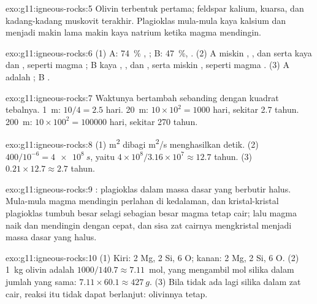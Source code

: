 \begin{solution}{exo:g11:igneous-rocks:5}
Olivin terbentuk pertama; feldspar kalium, kuarsa, dan kadang-kadang muskovit
terakhir. Plagioklas mula-mula kaya kalsium dan menjadi makin lama makin kaya
natrium ketika magma mendingin.
\end{solution}

\begin{solution}{exo:g11:igneous-rocks:6}
(1) A: \qty{74}{\percent} , ; B: \qty{47}{\percent}, .
(2) A miskin , , dan  serta kaya  dan
, seperti magma ; B kaya , , dan , serta
miskin , seperti magma . (3) A adalah ; B .
\end{solution}

\begin{solution}{exo:g11:igneous-rocks:7}
Waktunya bertambah sebanding dengan kuadrat tebalnya. \qty{1}{m}: $10/4 = 2.5$
hari. \qty{20}{m}: $10 \times 10^2 = 1000$ hari, sekitar 2.7 tahun.
\qty{200}{m}: $10 \times 100^2 = \num{100000}$ hari, sekitar 270 tahun.
\end{solution}

\begin{solution}{exo:g11:igneous-rocks:8}
(1) \unit{m^2} dibagi \unit{m^2/s} menghasilkan detik. (2) $400/10^{-6} =
\qty{4e8}{s}$, yaitu $4 \times 10^8 / 3.16 \times 10^7 \approx 12.7$
tahun. (3) $0.21 \times 12.7 \approx 2.7$ tahun.
\end{solution}

\begin{solution}{exo:g11:igneous-rocks:9}
 :  plagioklas dalam massa dasar yang berbutir
halus. Mula-mula magma mendingin perlahan di kedalaman, dan kristal-kristal
plagioklas tumbuh besar selagi sebagian besar magma tetap cair; lalu magma
naik dan mendingin dengan cepat, dan sisa zat cairnya mengkristal menjadi
massa dasar yang halus.
\end{solution}

\begin{solution}{exo:g11:igneous-rocks:10}
(1) Kiri: 2 Mg, 2 Si, 6 O; kanan: 2 Mg, 2 Si, 6 O. (2) \qty{1}{kg}
olivin adalah $1000/140.7 \approx 7.11$~mol, yang mengambil mol silika dalam
jumlah yang sama: $7.11 \times 60.1 \approx \qty{427}{g}$. (3) Bila tidak ada
lagi silika dalam zat cair, reaksi itu tidak dapat berlanjut: olivinnya tetap.
\end{solution}

